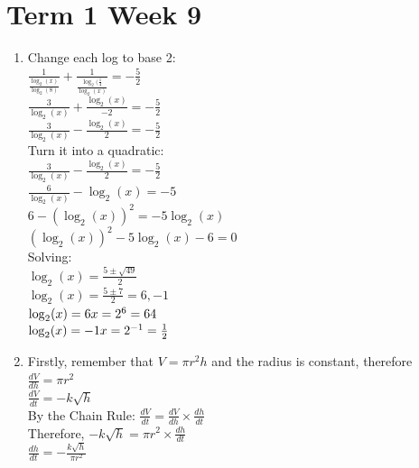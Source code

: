 \documentclass[../main.tex]{subfiles}
\begin{document}
\section*{Term 1 Week 9}
\begin{enumerate}
    \item 
    Change each log to base 2:\\
    \(\frac{1}{\frac{\log_2(x)}{\log_2(8)}}+\frac{1}{\frac{\log_2(\frac{1}{4}}{\log_2(x)}}=-\frac{5}{2}\)\\

    \(\frac{3}{\log_2(x)}+\frac{\log_2(x)}{-2}=-\frac{5}{2}\)\\

    \(\frac{3}{\log_2(x)}-\frac{\log_2(x)}{2}=-\frac{5}{2}\)\\

    Turn it into a quadratic:\\
    \(\frac{3}{\log_2(x)}-\frac{\log_2(x)}{2}=-\frac{5}{2}\)\\

    \(\frac{6}{\log_2(x)}-\log_2(x)=-5\)\\

    \(6-(\log_2(x))^2=-5\log_2(x)\)\\

    \((\log_2(x))^2-5\log_2(x)-6=0\)\\

    Solving:\\
    \(\log_2(x)=\frac{5\pm \sqrt{49}}{2}\)\\

    \(\log_2(x)=\frac{5\pm 7}{2}=6,-1\)\\

    \(\log_2(x)=6\\
    x=2^6=64\\
    \)\\
    \(
    \log_2(x)=-1\\
    x=2^{-1}=\frac{1}{2}
    \)
    

    \item
    Firstly, remember that \(V=\pi r^2 h\) and the radius is constant, therefore \(\frac{dV}{dh}=\pi r^2\)\\
    \(\frac{dV}{dt}=-k\sqrt{h}\)\\
    By the Chain Rule:
    \(\frac{dV}{dt}=\frac{dV}{dh}\times \frac{dh}{dt}\)\\

    Therefore, \(-k\sqrt{h}=\pi r^2 \times \frac{dh}{dt}\)\\
    \(\frac{dh}{dt}=-\frac{k\sqrt{h}}{\pi r^2}\)\\


\end{enumerate}
\end{document}

